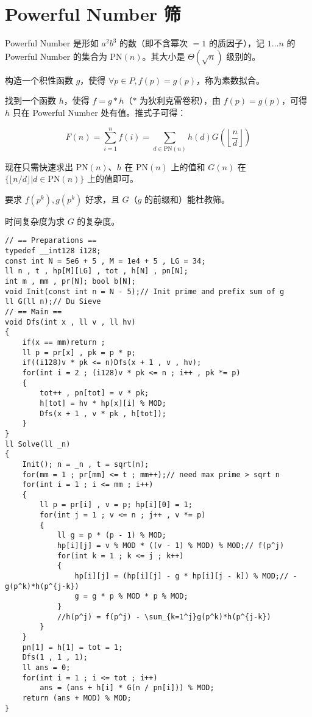 \section{Powerful Number 筛}

Powerful Number 是形如 $a^2b^3$ 的数（即不含幂次 $=1$ 的质因子），记 $1\dots n$ 的 Powerful Number 的集合为 $\mathrm{PN}(n)$。其大小是 $\Theta(\sqrt{n})$ 级别的。

构造一个积性函数 $g$，使得 $\forall p \in P, f(p) = g(p)$，称为素数拟合。

找到一个函数 $h$，使得 $f = g * h$（$*$ 为狄利克雷卷积），由 $f(p)=g(p)$，可得 $h$ 只在 Powerful Number 处有值。推式子可得：

$$
F(n) = \sum\limits_{i=1}^n f(i) = \sum_{d\in\mathrm{PN}(n)}h(d)G(\left\lfloor\frac{n}{d}\right\rfloor)
$$

现在只需快速求出 $\mathrm{PN}(n)$、$h$ 在 $\mathrm{PN}(n)$ 上的值和 $G(n)$ 在 $\{\lfloor n/d\rfloor | d \in \mathrm{PN}(n)\}$ 上的值即可。

要求 $f(p^k),g(p^k)$ 好求，且 $G$（$g$ 的前缀和）能杜教筛。

时间复杂度为求 $G$ 的复杂度。

\begin{verbatim}
// == Preparations ==
typedef __int128 i128;
const int N = 5e6 + 5 , M = 1e4 + 5 , LG = 34;
ll n , t , hp[M][LG] , tot , h[N] , pn[N];
int m , mm , pr[N]; bool b[N];
void Init(const int n = N - 5);// Init prime and prefix sum of g
ll G(ll n);// Du Sieve
// == Main ==
void Dfs(int x , ll v , ll hv)
{
	if(x == mm)return ;
	ll p = pr[x] , pk = p * p;
	if((i128)v * pk <= n)Dfs(x + 1 , v , hv);
	for(int i = 2 ; (i128)v * pk <= n ; i++ , pk *= p)
	{
		tot++ , pn[tot] = v * pk;
		h[tot] = hv * hp[x][i] % MOD;
		Dfs(x + 1 , v * pk , h[tot]);
	}
}
ll Solve(ll _n)
{
	Init(); n = _n , t = sqrt(n);
	for(mm = 1 ; pr[mm] <= t ; mm++);// need max prime > sqrt n
	for(int i = 1 ; i <= mm ; i++)
	{
		ll p = pr[i] , v = p; hp[i][0] = 1;
		for(int j = 1 ; v <= n ; j++ , v *= p)
		{
			ll g = p * (p - 1) % MOD; 
			hp[i][j] = v % MOD * ((v - 1) % MOD) % MOD;// f(p^j)
			for(int k = 1 ; k <= j ; k++)
			{
				hp[i][j] = (hp[i][j] - g * hp[i][j - k]) % MOD;// - g(p^k)*h(p^{j-k})
				g = g * p % MOD * p % MOD;
			}
			//h(p^j) = f(p^j) - \sum_{k=1^j}g(p^k)*h(p^{j-k})
		}
	}
	pn[1] = h[1] = tot = 1; 
	Dfs(1 , 1 , 1);
	ll ans = 0;
	for(int i = 1 ; i <= tot ; i++)
		ans = (ans + h[i] * G(n / pn[i])) % MOD;
	return (ans + MOD) % MOD;
}
\end{verbatim}